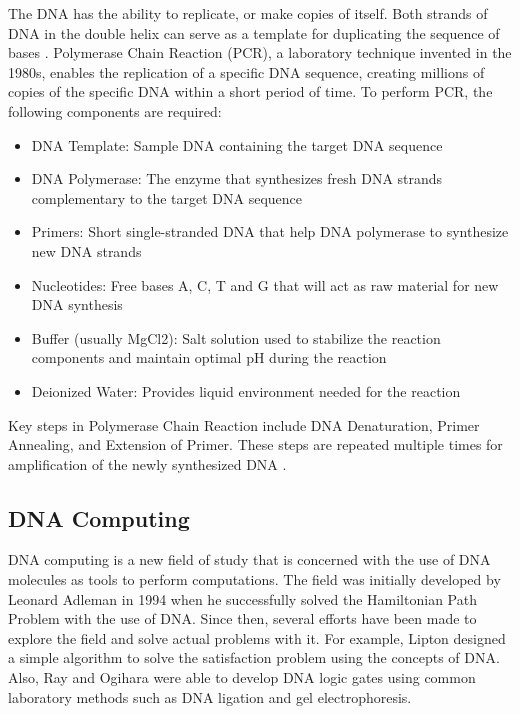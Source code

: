 The DNA has the ability to replicate, or make copies of itself. Both strands of DNA in the double helix can serve as a template for duplicating the sequence of bases \cite{dna_ghr}. Polymerase Chain Reaction (PCR), a laboratory technique invented in the 1980s, enables the replication of a specific DNA sequence, creating millions of copies of the specific DNA within a short period of time.  To perform PCR, the following components are required:
\begin{itemize}
    \item DNA Template: Sample DNA containing the target DNA sequence
    \item DNA Polymerase: The enzyme that synthesizes fresh DNA strands complementary to the target DNA sequence
    \item Primers: Short single-stranded DNA that help DNA polymerase to synthesize new DNA strands
    \item Nucleotides: Free bases A, C, T and G that will act as raw material for new DNA synthesis
    \item Buffer (usually MgCl2): Salt solution used to stabilize the reaction components and maintain optimal pH during the reaction
    \item Deionized Water: Provides liquid environment needed for the reaction
\end{itemize}
\par
Key steps in Polymerase Chain Reaction include DNA Denaturation, Primer Annealing, and Extension of Primer. These steps are repeated multiple times for amplification of the newly synthesized DNA \cite{pcr}.

\subsection{DNA Computing}

DNA computing is a new field of study that is concerned with the use of DNA molecules as tools to perform computations. The field was initially developed by Leonard Adleman in 1994 when he successfully solved the Hamiltonian Path Problem with the use of DNA. Since then, several efforts have been made to explore the field and solve actual problems with it. For example, Lipton \cite{intractable-problems} designed a simple algorithm to solve the satisfaction problem using the concepts of DNA. Also, Ray and Ogihara \cite{logic-gates} were able to develop DNA logic gates using common laboratory methods such as DNA ligation and gel electrophoresis.

